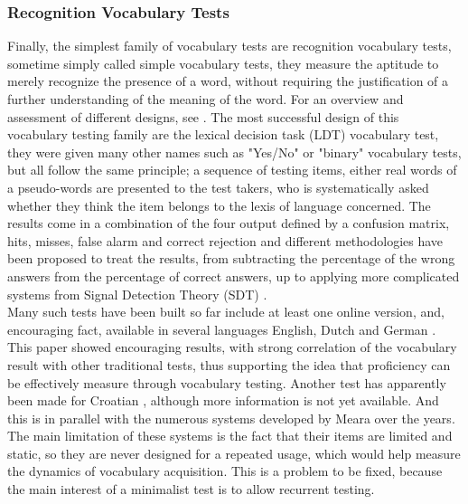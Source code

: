         \subsubsection{Recognition Vocabulary Tests}
Finally, the simplest family of vocabulary tests are recognition vocabulary tests, sometime simply called simple vocabulary tests, they measure the aptitude to merely recognize the presence of a word, without requiring the justification of a further understanding of the meaning of the word. For an overview and assessment of different designs, see \cite{meara_complexities_1994}. The most successful design of this vocabulary testing family are the lexical decision task (LDT) vocabulary test, they were given many other names such as "Yes/No" or "binary" vocabulary tests, but all follow the same principle; a sequence of testing items, either real words of a pseudo-words \parencite{meara_imaginary_2012} are presented to the test takers, who is systematically asked whether they think the item belongs to the lexis of language concerned. The results come in a combination of the four output defined by a confusion matrix, hits, misses, false alarm and correct rejection and different methodologies have been proposed to treat the results, from subtracting the percentage of the wrong answers from the percentage of correct answers, up to applying more complicated systems from Signal Detection Theory (SDT) \parencite{huibregtse_scores_2002}.\\
Many such tests have been built so far include at least one online version, and, encouraging fact, available in several languages English, Dutch and German \parencite{lemhofer_introducing_2012}. This paper showed encouraging results, with strong correlation of the vocabulary result with other traditional tests, thus supporting the idea that proficiency can be effectively measure through vocabulary testing. Another test has apparently been made for Croatian \parencite{srce_how_2025}, although more information is not yet available. And this is in parallel with the numerous systems developed by Meara over the years\cite{meara_complexities_1994}. The main limitation of these systems is the fact that their items are limited and static, so they are never designed for a repeated usage, which would help measure the dynamics of vocabulary acquisition. This is a problem to be fixed, because the main interest of a minimalist test is to allow recurrent testing.

